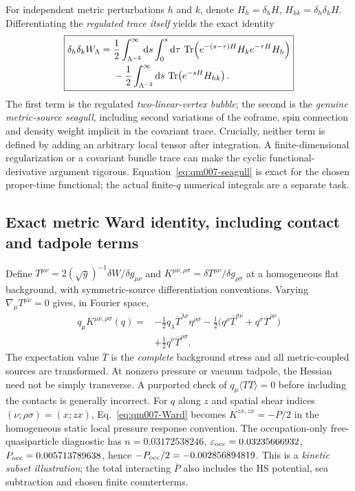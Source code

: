 \documentclass[11pt,a4paper]{article}
\begin{document}
For independent metric perturbations $h$ and $k$, denote $H_h=\delta_h H$, $H_{hk}=\delta_h\delta_k H$. Differentiating the \emph{regulated trace itself} yields the exact identity
\begin{equation}\label{eq:qm007-seagull}
 \boxed{\begin{aligned}
 \delta_h\delta_k W_\Lambda={}&\frac12\int_{\Lambda^{-2}}^\infty\mathrm d s\int_0^s\mathrm d\tau\,
 \operatorname{Tr}\!\left(e^{-(s-\tau)H}H_k e^{-\tau H}H_h\right)\\
 &-\frac12\int_{\Lambda^{-2}}^\infty\mathrm d s\,\operatorname{Tr}\!\left(e^{-sH}H_{hk}\right).
 \end{aligned}}
\end{equation}
The first term is the regulated \emph{two-linear-vertex bubble}; the second is the \emph{genuine metric-source seagull}, including second variations of the coframe, spin connection and density weight implicit in the covariant trace. Crucially, neither term is defined by adding an arbitrary local tensor after integration. A finite-dimensional regularization or a covariant bundle trace can make the cyclic functional-derivative argument rigorous. Equation~\eqref{eq:qm007-seagull} is exact for the chosen proper-time functional; the actual finite-$q$ numerical integrals are a separate task.

\subsection{Exact metric Ward identity, including contact and tadpole terms}
Define $T^{\mu\nu}=2(\sqrt g)^{-1}\delta W/\delta g_{\mu\nu}$ and $K^{\mu\nu,\rho\sigma}=\delta T^{\mu\nu}/\delta g_{\rho\sigma}$ at a homogeneous flat background, with symmetric-source differentiation conventions. Varying $\nabla_\mu T^{\mu\nu}=0$ gives, in Fourier space,
\begin{equation}\label{eq:qm007-Ward}
\boxed{\begin{aligned}
 q_\mu K^{\mu\nu,\rho\sigma}(q)={}&-\frac12 q_\lambda\overline T^{\lambda\nu}\eta^{\rho\sigma}
 -\frac12\big(q^\rho\overline T^{\sigma\nu}+q^\sigma\overline T^{\rho\nu}\big)\\
 &+\frac12q^\nu\overline T^{\rho\sigma}.
\end{aligned}}
\end{equation}
The expectation value $\overline T$ is the \emph{complete} background stress and all metric-coupled sources are transformed. At nonzero pressure or vacuum tadpole, the Hessian need not be simply transverse. A purported check of $q_\mu\langle TT\rangle=0$ before including the contacts is generally incorrect. For $q$ along $z$ and spatial shear indices $(\nu;\rho\sigma)=(x;zx)$, Eq.~\eqref{eq:qm007-Ward} becomes $K^{zx,zx}=-\overline P/2$ in the homogeneous static local pressure response convention. The occupation-only free-quasiparticle diagnostic has $n=0.03172538246$, $\varepsilon_{\rm occ}=0.03235666932$, $P_{\rm occ}=0.005713789638$, hence $-P_{\rm occ}/2=-0.002856894819$. This is a \emph{kinetic subset illustration}; the total interacting $\overline P$ also includes the HS potential, sea subtraction and chosen finite counterterms.
\end{document}
